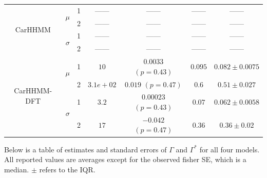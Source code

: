 \documentclass[12pt]{TD-CJS}
\begin{document}
{\begin{tabular}{ccccccc}
\multirow{4}{*}{CarHHMM}    & \multirow{2}{*}{$\mu$}        & 1                                & ------                         & ------                     & ------                             & ------                                      \\
                            &                               & 2                                & ------                         & ------                     & ------                             & ------                                      \\
                            & \multirow{2}{*}{$\sigma$}     & 1                                & ------                         & ------                     & ------                             & ------                                      \\
                            &                               & 2                                & ------                         & ------                     & ------                             & ------                                      \\ \hline
\multirow{4}{*}{CarHHMM-DFT}& \multirow{2}{*}{$\mu$}        & 1                                & $10$                         & $0.0033$ $(p=0.43)$          & $0.095$                             & $0.082 \pm 0.0075$                             \\
                            &                               & 2                                & $3.1e+02$                         & $0.019$ $(p=0.47)$          & $0.6$                             & $0.51 \pm 0.027$                             \\
                            & \multirow{2}{*}{$\sigma$}     & 1                                & $3.2$                         & $0.00023$ $(p=0.43)$          & $0.07$                             & $0.062 \pm 0.0058$                             \\
                            &                               & 2                                & $17$                         & $-0.042$ $(p=0.47)$          & $0.36$                             & $0.36 \pm 0.02$                             
\end{tabular}
}

\newpage
Below is a table of estimates and standard errors of $\Gamma$ and $\Gamma^*$ for all four models. All reported values are averages except for the observed fisher SE, which is a median. $\pm$ refers to the IQR.
\vspace{1cm}
\end{document}
